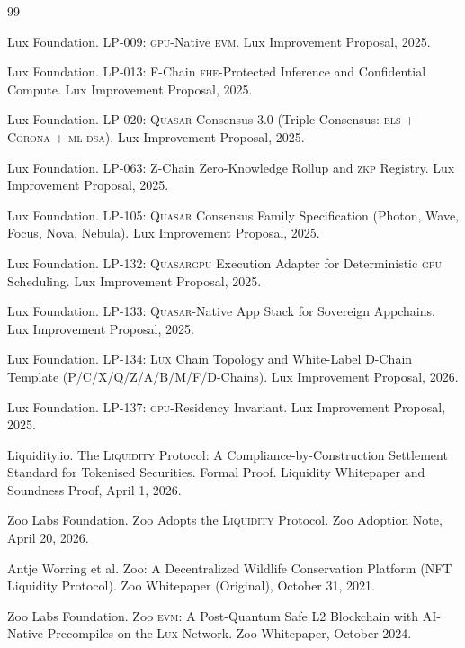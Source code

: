 \documentclass[11pt,letterpaper]{article}
\newcommand{\Lux}{\textsc{Lux}}
\newcommand{\Quasar}{\textsc{Quasar}}
\newcommand{\QuasarGPU}{\textsc{Quasar}\textsc{gpu}}
\newcommand{\Liquidity}{\textsc{Liquidity}}
\newcommand{\GPU}{\textsc{gpu}}
\newcommand{\FHE}{\textsc{fhe}}
\newcommand{\ZKP}{\textsc{zkp}}
\newcommand{\BLS}{\textsc{bls}}
\newcommand{\MLDSA}{\textsc{ml-dsa}}
\newcommand{\Corona}{\textsc{Corona}}
\begin{document}
\begin{thebibliography}{99}

Lux Foundation.
\newblock LP-009: \GPU{}-Native \textsc{evm}.
\newblock Lux Improvement Proposal, 2025.

Lux Foundation.
\newblock LP-013: F-Chain \FHE{}-Protected Inference and Confidential Compute.
\newblock Lux Improvement Proposal, 2025.

Lux Foundation.
\newblock LP-020: \Quasar{} Consensus 3.0 (Triple Consensus: \BLS{} + \Corona{} + \MLDSA{}).
\newblock Lux Improvement Proposal, 2025.

Lux Foundation.
\newblock LP-063: Z-Chain Zero-Knowledge Rollup and \ZKP{} Registry.
\newblock Lux Improvement Proposal, 2025.

Lux Foundation.
\newblock LP-105: \Quasar{} Consensus Family Specification (Photon, Wave, Focus, Nova, Nebula).
\newblock Lux Improvement Proposal, 2025.

Lux Foundation.
\newblock LP-132: \QuasarGPU{} Execution Adapter for Deterministic \GPU{} Scheduling.
\newblock Lux Improvement Proposal, 2025.

Lux Foundation.
\newblock LP-133: \Quasar{}-Native App Stack for Sovereign Appchains.
\newblock Lux Improvement Proposal, 2025.

Lux Foundation.
\newblock LP-134: \Lux{} Chain Topology and White-Label D-Chain Template (P/C/X/Q/Z/A/B/M/F/D-Chains).
\newblock Lux Improvement Proposal, 2026.

Lux Foundation.
\newblock LP-137: \GPU{}-Residency Invariant.
\newblock Lux Improvement Proposal, 2025.

Liquidity.io.
\newblock The \Liquidity{} Protocol: A Compliance-by-Construction Settlement Standard for Tokenised Securities. Formal Proof.
\newblock Liquidity Whitepaper and Soundness Proof, April 1, 2026.

Zoo Labs Foundation.
\newblock Zoo Adopts the \Liquidity{} Protocol.
\newblock Zoo Adoption Note, April 20, 2026.

Antje Worring et al.
\newblock Zoo: A Decentralized Wildlife Conservation Platform (NFT Liquidity Protocol).
\newblock Zoo Whitepaper (Original), October 31, 2021.

Zoo Labs Foundation.
\newblock Zoo \textsc{evm}: A Post-Quantum Safe L2 Blockchain with AI-Native Precompiles on the \Lux{} Network.
\newblock Zoo Whitepaper, October 2024.


\end{thebibliography}
\end{document}
